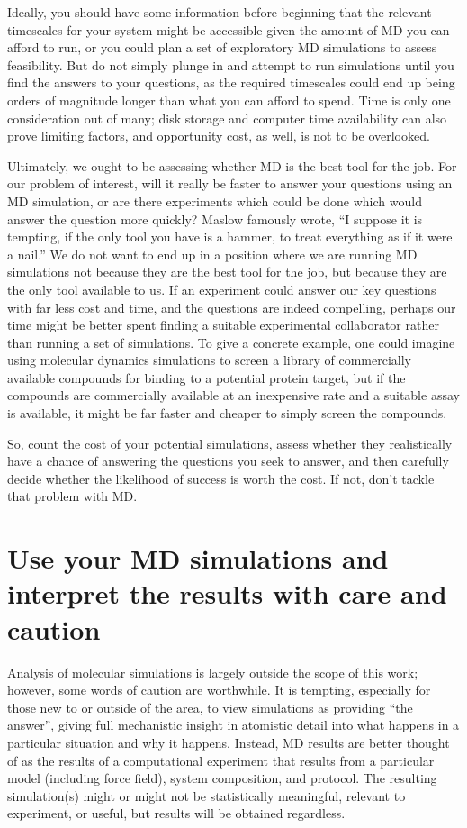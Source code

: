 \documentclass[9pt,bestpractices]{livecoms}
\begin{document}
Ideally, you should have some information before beginning that the relevant timescales for your system might be accessible given the amount of MD you can afford to run, or you could plan a set of exploratory MD simulations to assess feasibility. 
But do not simply plunge in and attempt to run simulations until you find the answers to your questions, as the required timescales could end up being orders of magnitude longer than what you can afford to spend.
Time is only one consideration out of many; disk storage and computer time availability can also prove limiting factors, and opportunity cost, as well, is not to be overlooked.

Ultimately, we ought to be assessing whether MD is the best tool for the job.
For our problem of interest, will it really be faster to answer your questions using an MD simulation, or are there experiments which could be done which would answer the question more quickly? 
Maslow famously wrote, ``I suppose it is tempting, if the only tool you have is a hammer, to treat everything as if it were a nail.''
We do not want to end up in a position where we are running MD simulations not because they are the best tool for the job, but because they are the only tool available to us.
If an experiment could answer our key questions with far less cost and time, and the questions are indeed compelling, perhaps our time might be better spent finding a suitable experimental collaborator rather than running a set of simulations.
To give a concrete example, one could imagine using molecular dynamics simulations to screen a library of commercially available compounds for binding to a potential protein target, but if the compounds are commercially available at an inexpensive rate and a suitable assay is available, it might be far faster and cheaper to simply screen the compounds.

So, count the cost of your potential simulations, assess whether they realistically have a chance of answering the questions you seek to answer, and then carefully decide whether the likelihood of success is worth the cost. 
If not, don't tackle that problem with MD.

\section{Use your MD simulations and interpret the results with care and caution}

Analysis of molecular simulations is largely outside the scope of this work; however, some words of caution are worthwhile.
It is tempting, especially for those new to or outside of the area, to view simulations as providing ``the answer'', giving full mechanistic insight in atomistic detail into what happens in a particular situation and why it happens.
Instead, MD results are better thought of as the results of a computational experiment that results from a particular model (including force field), system composition, and protocol.
The resulting simulation(s) might or might not be statistically meaningful, relevant to experiment, or useful, but results will be obtained regardless.
\end{document}
